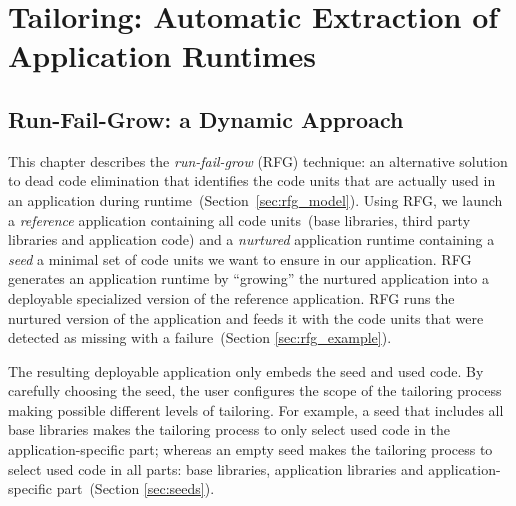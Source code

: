 
\part{Tailoring: Automatic Extraction of Application Runtimes}
\chapter{Run-Fail-Grow: a Dynamic Approach}
\minitoc
\introduction



This chapter describes the \emph{run-fail-grow} (RFG) technique: an alternative solution to dead code elimination that identifies the code units that are actually used in an application during runtime~(Section~\ref{sec:rfg_model}).
Using RFG, we launch a \emph{reference} application containing all code units~(base libraries, third party libraries and application code) and a \emph{nurtured} application runtime containing a \emph{seed} \ie a minimal set of code units we want to ensure in our application.
RFG generates an application runtime by ``growing'' the nurtured application into a deployable specialized version of the reference application. 
RFG runs the nurtured version of the application and feeds it with the code units that were detected as missing with a failure~(Section \ref{sec:rfg_example}).

The resulting deployable application only embeds the seed and used code.
By carefully choosing the seed, the user configures the scope of the tailoring process making possible different levels of tailoring.
For example, a seed that includes all base libraries makes the tailoring process to only select used code in the application-specific part; whereas an empty seed makes the tailoring process to select used code in all parts: base libraries, application libraries and application-specific part~(Section \ref{sec:seeds}).

